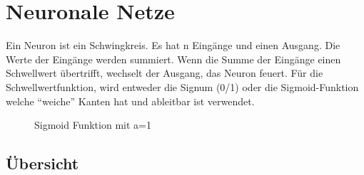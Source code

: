 \section{Neuronale Netze}
Ein Neuron ist ein Schwingkreis. Es hat n Eingänge und einen Ausgang. Die Werte der
Eingänge werden summiert. Wenn die Summe der Eingänge einen Schwellwert übertrifft, wechselt der Ausgang, das Neuron feuert.
Für die Schwellwertfunktion, wird entweder die Signum (0/1) oder die Sigmoid-Funktion welche ``weiche'' Kanten hat und ableitbar ist verwendet.
\begin{figure}[htb]
	\centering
	
	\caption{Sigmoid Funktion mit a=1}
\end{figure}

\subsection{Übersicht}
